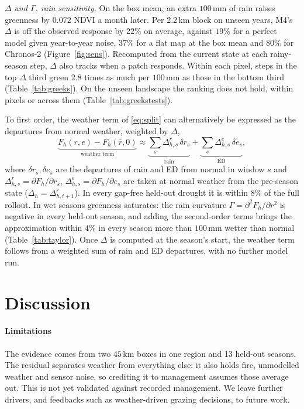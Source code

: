 \documentclass[letterpaper]{article} %
\begin{document}
\textit{$\Delta$ and $\Gamma$, rain sensitivity.} On the box mean, an extra $100$\,mm of rain raises greenness by $0.072$ NDVI a month later. Per 2.2\,km block on unseen years, M4's $\Delta$ is off the observed response by $22\%$ on average, against $19\%$ for a perfect model given year-to-year noise, $37\%$ for a flat map at the box mean and $80\%$ for Chronos-2 (Figure~\ref{fig:sens}). Recomputed from the current state at each rainy-season step, $\Delta$ also tracks when a patch responds. Within each pixel, steps in the top $\Delta$ third green $2.8$ times as much per $100$\,mm as those in the bottom third (Table~\ref{tab:greeks}). On the unseen landscape the ranking does not hold, within pixels or across them (Table~\ref{tab:greekstests}).

To first order, the weather term of \eqref{eq:split} can alternatively be expressed as the departures from normal weather, weighted by $\Delta$,
\begin{equation}
\underbrace{F_h(r,e)-F_h(\bar r,0)}_{\text{weather term}}\approx\underbrace{\textstyle\sum_s \Delta^{r}_{h,s}\,\delta r_s}_{\text{rain}}+\underbrace{\textstyle\sum_s \Delta^{e}_{h,s}\,\delta e_s}_{\text{ED}},
\label{eq:taylor}
\end{equation}
where $\delta r_s,\delta e_s$ are the departures of rain and ED from normal in window $s$ and $\Delta^r_{h,s}=\partial F_h/\partial r_s$, $\Delta^e_{h,s}=\partial F_h/\partial e_s$ are taken at normal weather from the pre-season state ($\Delta_h=\Delta^r_{h,t+1}$). In every gap-free held-out drought it is within $8\%$ of the full rollout. In wet seasons greenness saturates: the rain curvature $\Gamma=\partial^2F_h/\partial r^2$ is negative in every held-out season, and adding the second-order terms brings the approximation within $4\%$ in every season more than $100$\,mm wetter than normal (Table~\ref{tab:taylor}). Once $\Delta$ is computed at the season's start, the weather term follows from a weighted sum of rain and ED departures, with no further model run.

\section{Discussion}

\paragraph{Limitations} The evidence comes from two $45$\,km boxes in one region and 13 held-out seasons. The residual separates weather from everything else: it also holds fire, unmodelled weather and sensor noise, so crediting it to management assumes those average out. This is not yet validated against recorded management. We leave further drivers, and feedbacks such as weather-driven grazing decisions, to future work.
\end{document}
